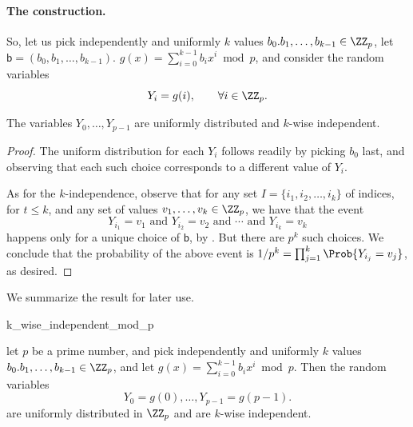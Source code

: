\paragraph*{The construction.}

So, let us pick independently and uniformly $k$ values
$b_0. b_1, \ldots, b_{k-1} \in \ZZ_p$, let
$\mathsf{b} = (b_0, b_1,\ldots, b_{k-1})$.
$g(x) = \sum_{i=0}^{k-1} b_i x^i \bmod p$, and consider the random
variables
\begin{equation*}
    Y_i = g(i), \qquad\forall i \in \ZZ_p.
\end{equation*}

\begin{lemma}
    The variables $Y_0, \ldots,Y_{p-1}$ are uniformly distributed and
    $k$-wise independent.
\end{lemma}
\begin{proof}
    The uniform distribution for each $Y_i$ follows readily by picking
    $b_0$ last, and observing that each such choice corresponds to a
    different value of $Y_i$.
    
    As for the $k$-independence, observe that for any set
    $I = \{i_1, i_2, \ldots, i_k\}$ of indices, for $t \leq k$, and
    any set of values $v_1, \ldots, v_k \in \ZZ_p$, we have that the event
    \begin{equation*}
        Y_{i_1} = v_1 \text{ and }
        Y_{i_2} = v_2 \text{ and } \cdots \text{ and }
        Y_{i_k} = v_k%
    \end{equation*}
    happens only for a unique choice of $\mathsf{b}$, by
    . But there are $p^k$ such choices. We
    conclude that the probability of the above event is
    $1/p^k = \prod_{j=1}^k \Prob{Y_{i_j} = v_j}$, as desired.
\end{proof}

We summarize the result for later use.

\begin{fragment}{k_wise_independent_mod_p}
    \begin{theorem}
        let $p$ be a prime number, and pick independently and
        uniformly $k$ values $b_0. b_1, \ldots, b_{k-1} \in \ZZ_p$,
        and let
        $g(x) = \sum_{i=0}^{k-1} b_i x^i \bmod p$. Then  the
        random variables
        \begin{equation*}
            Y_0 = g(0), \ldots, Y_{p-1} = g(p-1).
        \end{equation*}
        are uniformly distributed in $\ZZ_p$ and are $k$-wise independent.
    \end{theorem}
\end{fragment}

